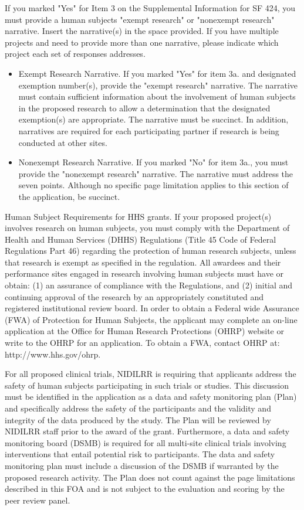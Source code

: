 If you marked "Yes" for Item 3 on the Supplemental Information for SF 424, you must provide a human subjects "exempt research" or "nonexempt research" narrative. Insert the narrative(s) in the space provided. If you have multiple projects and need to provide more than one narrative, please indicate which project each set of responses addresses.

\begin{itemize}
    \item Exempt Research Narrative. If you marked "Yes" for item 3a. and designated exemption number(s), provide the "exempt research" narrative. The narrative must contain sufficient information about the involvement of human subjects in the proposed research to allow a determination that the designated exemption(s) are appropriate. The narrative must be succinct. In addition, narratives are required for each participating partner if research is being conducted at other sites.
    \item Nonexempt Research Narrative. If you marked "No" for item 3a., you must provide the "nonexempt research" narrative. The narrative must address the seven points. Although no specific page limitation applies to this section of the application, be succinct.
\end{itemize}

Human Subject Requirements for HHS grants. If your proposed project(s) involves research on human subjects, you must comply with the Department of Health and Human Services (DHHS)
Regulations (Title 45 Code of Federal Regulations Part 46) regarding the protection of human research subjects, unless that research is exempt as specified in the regulation. All awardees and their performance sites engaged in research involving human subjects must have or obtain:
(1) an assurance of compliance with the Regulations, and (2) initial and continuing approval of the research by an appropriately constituted and registered institutional review board. In
order to obtain a Federal wide Assurance (FWA) of Protection for Human Subjects, the applicant may complete an on-line application at the Office for Human Research Protections (OHRP) website or write to the OHRP for an application. To obtain a FWA, contact OHRP at: http://www.hhs.gov/ohrp.

For all proposed clinical trials, NIDILRR is requiring that applicants address the safety of human subjects participating in such trials or studies. This discussion must be identified in the application as a data and safety monitoring plan (Plan) and specifically address the safety of the participants and the validity and integrity of the data produced by the study. The Plan will be reviewed by NIDILRR staff prior to the award of the grant. Furthermore, a data and safety monitoring board (DSMB) is required for all multi-site clinical trials involving interventions that entail potential risk to participants. The data and safety monitoring plan must include a discussion of the DSMB if warranted by the proposed research activity. The Plan does not count against the page limitations described in this FOA and is not subject to the evaluation and scoring by the peer review panel.

